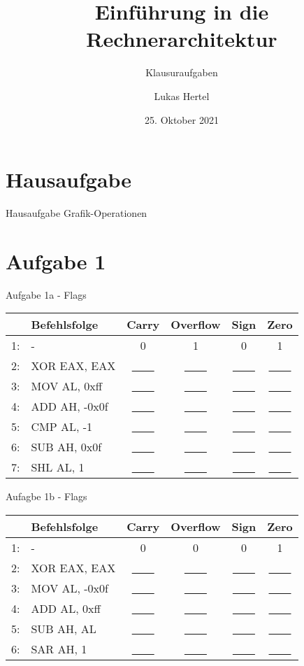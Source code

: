\documentclass[
  german,            %
  aspectratio=169,    %
  sectionpage=false,   %
]{tumbeamer}
\title{Einführung in die Rechnerarchitektur}
\subtitle{Klausuraufgaben}
\author{Lukas Hertel}
\institute{\theChairName\\\theDepartmentName\\\theUniversityName}
\date[25.10.2021]{25. Oktober 2021}
\begin{document}
\maketitle

\section{Hausaufgabe}
\begin{frame}{Hausaufgabe Grafik-Operationen}

\end{frame}
\section{Aufgabe 1}
\begin{frame}{Aufgabe 1a - Flags}

\begin{center}
	\begin{tabular}{r l c c c c}
		& Befehlsfolge & Carry & Overflow & Sign & Zero\\ \hline
		1: & - & 0 & 1 & 0 & 1\\
		2: & XOR EAX, EAX & \underline{~~~~} & \underline{~~~~} & \underline{~~~~} & \underline{~~~~}\\
		3: & MOV AL, 0xff & \underline{~~~~} & \underline{~~~~} & \underline{~~~~} & \underline{~~~~}\\
		4: & ADD AH, -0x0f & \underline{~~~~} & \underline{~~~~} & \underline{~~~~} & \underline{~~~~}\\
		5: & CMP AL, -1 & \underline{~~~~} & \underline{~~~~} & \underline{~~~~} & \underline{~~~~}\\
		6: & SUB AH, 0x0f & \underline{~~~~} & \underline{~~~~} & \underline{~~~~} & \underline{~~~~}\\
		7: & SHL AL, 1 & \underline{~~~~} & \underline{~~~~} & \underline{~~~~} & \underline{~~~~}
	\end{tabular}
\end{center}
\end{frame}
\begin{frame}{Aufagbe 1b - Flags}
\begin{center}
	\begin{tabular}{r l c c c c}
		& Befehlsfolge & Carry & Overflow & Sign & Zero\\ \hline
		1: & - & 0 & 0 & 0 & 1\\
		2: & XOR EAX, EAX & \underline{~~~~} & \underline{~~~~} & \underline{~~~~} & \underline{~~~~}\\
		3: & MOV AL, -0x0f & \underline{~~~~} & \underline{~~~~} & \underline{~~~~} & \underline{~~~~}\\
		4: & ADD AL, 0xff & \underline{~~~~} & \underline{~~~~} & \underline{~~~~} & \underline{~~~~}\\
		5: & SUB AH, AL & \underline{~~~~} & \underline{~~~~} & \underline{~~~~} & \underline{~~~~}\\
		6: & SAR AH, 1 & \underline{~~~~} & \underline{~~~~} & \underline{~~~~} & \underline{~~~~}
	\end{tabular}
\end{center}
\end{frame}
\end{document}
